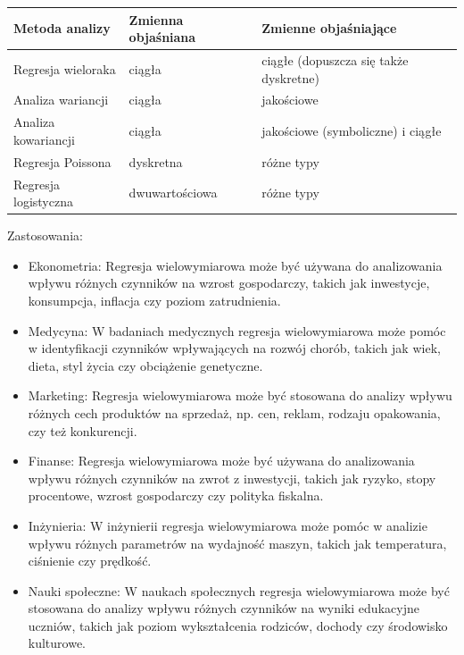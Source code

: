 \documentclass[
  polish,
  letterpaper,
  DIV=11,
  numbers=noendperiod]{scrreprt}
\begin{document}
\begin{longtable}[]{@{}
  >{\raggedright\arraybackslash}p{}
  >{\raggedright\arraybackslash}p{}
  >{\raggedright\arraybackslash}p{}@{}}
\toprule\noalign{}
\begin{minipage}[b]{\linewidth}\raggedright
Metoda analizy
\end{minipage} & \begin{minipage}[b]{\linewidth}\raggedright
Zmienna objaśniana
\end{minipage} & \begin{minipage}[b]{\linewidth}\raggedright
Zmienne objaśniające
\end{minipage} \\
\midrule\noalign{}
\endhead
\bottomrule\noalign{}
\endlastfoot
Regresja wieloraka & ciągła & ciągłe (dopuszcza się także dyskretne) \\
Analiza wariancji & ciągła & jakościowe \\
Analiza kowariancji & ciągła & jakościowe (symboliczne) i ciągłe \\
Regresja Poissona & dyskretna & różne typy \\
Regresja logistyczna & dwuwartościowa & różne typy \\
\end{longtable}

Zastosowania:

\begin{itemize}
\item
  Ekonometria: Regresja wielowymiarowa może być używana do analizowania
  wpływu różnych czynników na wzrost gospodarczy, takich jak inwestycje,
  konsumpcja, inflacja czy poziom zatrudnienia.
\item
  Medycyna: W badaniach medycznych regresja wielowymiarowa może pomóc w
  identyfikacji czynników wpływających na rozwój chorób, takich jak
  wiek, dieta, styl życia czy obciążenie genetyczne.
\item
  Marketing: Regresja wielowymiarowa może być stosowana do analizy
  wpływu różnych cech produktów na sprzedaż, np. cen, reklam, rodzaju
  opakowania, czy też konkurencji.
\item
  Finanse: Regresja wielowymiarowa może być używana do analizowania
  wpływu różnych czynników na zwrot z inwestycji, takich jak ryzyko,
  stopy procentowe, wzrost gospodarczy czy polityka fiskalna.
\item
  Inżynieria: W inżynierii regresja wielowymiarowa może pomóc w analizie
  wpływu różnych parametrów na wydajność maszyn, takich jak temperatura,
  ciśnienie czy prędkość.
\item
  Nauki społeczne: W naukach społecznych regresja wielowymiarowa może
  być stosowana do analizy wpływu różnych czynników na wyniki edukacyjne
  uczniów, takich jak poziom wykształcenia rodziców, dochody czy
  środowisko kulturowe.
\end{itemize}
\end{document}
